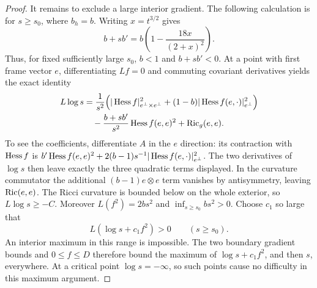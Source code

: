 \begin{proof}
It remains to exclude a large interior gradient. The following
calculation is for $s\geq s_0$, where $b_h=b$.
Writing $x=t^{3/2}$ gives
\[
 b+s b'=b\left(1-\frac{18x}{(2+x)^2}\right).
\]
Thus, for fixed sufficiently large $s_0$, $b<1$ and $b+s b'<0$.
At a point with first frame vector $e$, differentiating $Lf=0$
and commuting covariant derivatives yields the exact identity
\begin{equation}\label{str-pde-log-gradient}
\begin{aligned}
 L\log s
 &=\frac{1}{s^2}\Bigl(
 |\operatorname{Hess} f|_{e^\perp\times e^\perp}^2
 +(1-b)|\operatorname{Hess} f(e,\cdot)|_{e^\perp}^2\Bigr)\\
 &\quad-\frac{b+s b'}{s^2}\operatorname{Hess} f(e,e)^2+\operatorname{Ric}_g(e,e).
\end{aligned}
\end{equation}
To see the coefficients, differentiate $A$ in the $e$ direction:
its contraction with $\operatorname{Hess} f$ is
$b'\operatorname{Hess} f(e,e)^2+
 2(b-1)s^{-1}|\operatorname{Hess} f(e,\cdot)|_{e^\perp}^2$.
The two derivatives of $\log s$ then leave exactly the three
quadratic terms displayed. In the curvature commutator the
additional $(b-1)e\otimes e$ term vanishes by antisymmetry, leaving
$\operatorname{Ric}(e,e)$.
The Ricci curvature is bounded below on the whole exterior, so
$L\log s\geq-C$. Moreover $L(f^2)=2b s^2$ and
$\inf_{s\geq s_0}b s^2>0$. Choose $c_1$ so large that
\[
 L(\log s+c_1f^2)>0\qquad(s\geq s_0).
\]
An interior maximum in this range is impossible. The two boundary
gradient bounds and $0\leq f\leq D$ therefore bound the maximum
of $\log s+c_1f^2$, and then $s$, everywhere. At a critical point
$\log s=-\infty$, so such points cause no difficulty in this
maximum argument.
\end{proof}

